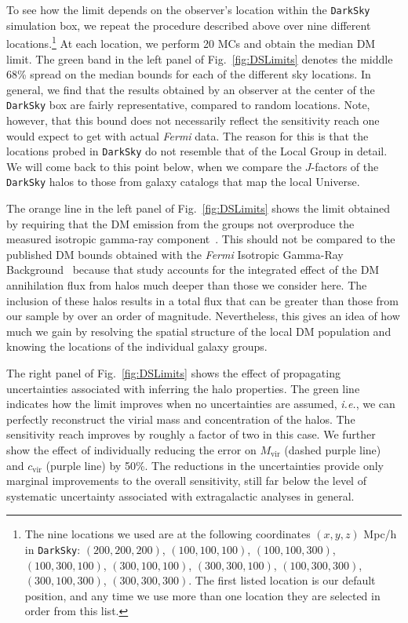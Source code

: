To see how the limit depends on the observer's location within the \texttt{DarkSky} simulation box, we repeat the procedure described above over nine different locations.\footnote{The nine locations we used are at the following coordinates $(x,y,z)$ Mpc/h in \texttt{DarkSky}: $(200,200,200)$, $(100,100,100)$, $(100,100,300)$, $(100,300,100)$, $(300,100,100)$, $(300,300,100)$, $(100,300,300)$, $(300,100,300)$, $(300,300,300)$. The first listed location is our default position, and any time we use more than one location they are selected in order from this list.}  At each location, we perform 20 MCs and obtain the median DM limit.  The green band in the left panel of Fig.~\ref{fig:DSLimits} denotes the middle 68\% spread on the median bounds for each of the different sky locations. 
In general, we find that the results obtained by an observer at the center of the \texttt{DarkSky} box are fairly representative, compared to random locations.  Note, however, that this bound does not necessarily reflect the sensitivity reach one would expect to get with actual \emph{Fermi} data. The reason for this is that the locations probed in \texttt{DarkSky} do not resemble that of the Local Group in detail.
We will come back to this point below, when we compare the $J$-factors of the \texttt{DarkSky} halos to those from galaxy catalogs that map the local Universe.

The orange line in the left panel of Fig.~\ref{fig:DSLimits} shows the limit obtained by requiring that the DM emission from the groups not overproduce the measured isotropic gamma-ray component~\cite{Ackermann:2014usa}. This should not be compared to the published DM bounds obtained with the \emph{Fermi} Isotropic Gamma-Ray Background~\cite{Ackermann:2015tah} because that study accounts for the integrated effect of the DM annihilation flux from halos much deeper than those we consider here.  The inclusion of these halos results in a total flux that can be greater than those from our sample by over an order of magnitude. Nevertheless, this gives an idea of how much we gain by resolving the spatial structure of the local DM population and knowing the locations of the individual galaxy groups.

The right panel of Fig.~\ref{fig:DSLimits} shows the effect of propagating uncertainties associated with inferring the halo properties. The green line indicates how the limit improves when no uncertainties are assumed, \emph{i.e.}, we can perfectly reconstruct the virial mass and concentration of the halos. The sensitivity reach improves by roughly a factor of two in this case. We further show the effect of individually reducing the error on $M_\text{vir}$ (dashed purple line) and $c_\text{vir}$ (purple line) by 50\%. The reductions in the uncertainties provide only marginal improvements to the overall sensitivity, still far below the level of systematic uncertainty associated with extragalactic analyses in general.

